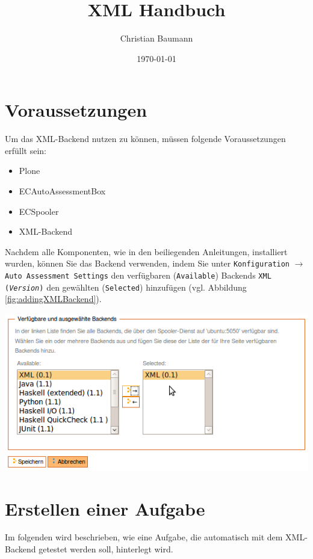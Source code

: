 \documentclass[a4paper]{scrartcl}
\title{XML Handbuch}
\author{Christian Baumann}
\date{\today}
\newcommand{\anf}[1]{\glqq{}#1\grqq{}}
\begin{document}
  \tableofcontents
  
  \newpage
  
	\section{Voraussetzungen}
	Um das XML-Backend nutzen zu können, müssen folgende Voraussetzungen erfüllt sein:
	\begin{itemize}
	  \item Plone
	  \item ECAutoAssessmentBox
	  \item ECSpooler
	  \item XML-Backend
	\end{itemize}
	Nachdem alle Komponenten, wie in den beiliegenden Anleitungen, installiert wurden, können Sie das Backend verwenden, indem Sie unter \texttt{Konfiguration} $\rightarrow$ \texttt{Auto Assessment Settings} den verfügbaren (\texttt{Available}) Backends \anf{\texttt{XML (\textit{Version})}} den gewählten (\texttt{Selected}) hinzufügen (vgl. Abbildung \ref{fig:addingXMLBackend}).
	
  \begin{center}
    \captionsetup{type=figure}
	  \includegraphics[width=1\textwidth]{images/AddingXMLBackend.png}
	  \label{fig:addingXMLBackend}
  \end{center}
	
	\section{Erstellen einer Aufgabe}
	  Im folgenden wird beschrieben, wie eine Aufgabe, die automatisch mit dem XML-Backend getestet werden soll, hinterlegt wird.
	  
\end{document}
